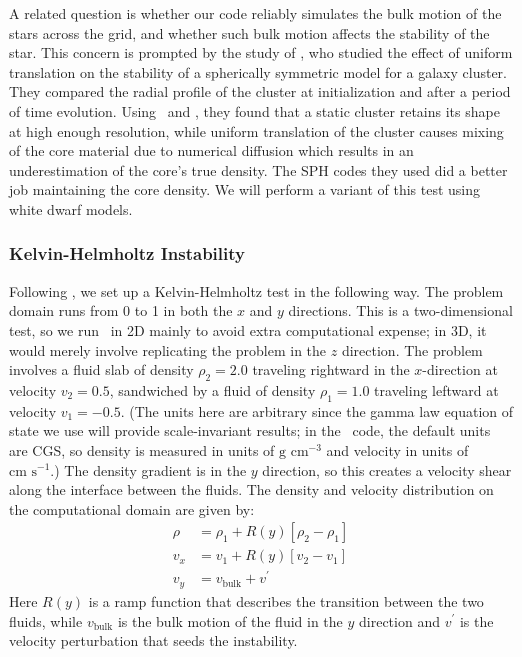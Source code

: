 \documentclass[12pt]{article}
\begin{document}
A related question is whether our code reliably simulates the bulk
motion of the stars across the grid, and whether such bulk motion
affects the stability of the star. This concern is prompted by the
study of \cite{tasker:2008}, who studied the effect of uniform
translation on the stability of a spherically symmetric model for a
galaxy cluster. They compared the radial profile of the cluster at
initialization and after a period of time evolution. Using \flash\ and
\enzo, they found that a static cluster retains its shape at high
enough resolution, while uniform translation of the cluster causes
mixing of the core material due to numerical diffusion which results
in an underestimation of the core's true density. The SPH codes they
used did a better job maintaining the core density. We will perform a
variant of this test using white dwarf models.

\subsubsection{Kelvin-Helmholtz Instability}
\label{sec:khi}

Following \cite{robertson:2010}, we set up a Kelvin-Helmholtz test in
the following way. The problem domain runs from 0 to 1 in both the $x$
and $y$ directions. This is a two-dimensional test, so we run
\castro\ in 2D mainly to avoid extra computational expense; in 3D, it
would merely involve replicating the problem in the $z$ direction.
The problem involves a fluid slab of density $\rho_2 = 2.0$ traveling rightward in the
$x$-direction at velocity $v_2 = 0.5$, sandwiched by a fluid of
density $\rho_1 = 1.0$ traveling leftward at velocity $v_1 =-0.5$.
(The units here are arbitrary since the gamma law equation of state we use
will provide scale-invariant results; in the \castro\ code, the default units are CGS,
so density is measured in units of $\text{g cm}^{-3}$ and velocity in units of $\text{cm s}^{-1}$.)
The density gradient is in the $y$ direction, so this creates a
velocity shear along the interface between the fluids. The density and
velocity distribution on the computational domain are given by:
\begin{align}
  \rho &= \rho_1 + R(y)\left[\rho_2 - \rho_1\right] \\
  v_x  &= v_1 + R(y)\left[v_2 - v_1\right] \\
  v_y  &= v_{\text{bulk}} + v^\prime
\end{align}
Here $R(y)$ is a ramp function that describes the transition between
the two fluids, while $v_{\text{bulk}}$ is the bulk motion of the
fluid in the $y$ direction and $v^\prime$ is the velocity perturbation
that seeds the instability.
\end{document}
